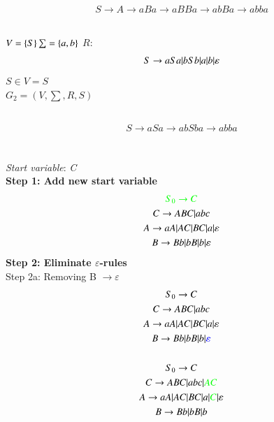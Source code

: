 \documentclass[12pt,letterpaper]{article}
\begin{document}
	\subsection{}
		\begin{gather*}
			S \rightarrow A\rightarrow aBa\rightarrow aBBa\rightarrow abBa\rightarrow abba
		\end{gather*}
	\subsection{}
		$V=\{S\}\\\sum=\{a,b\}\\$
		$R:$
		\begin{gather*}
			S \rightarrow aSa\arrowvert bSb\arrowvert a\arrowvert b\arrowvert \varepsilon
		\end{gather*}
		$S\in V=S$\\
		$G_2=(V,\sum,R,S)$
	\subsection{}
		\begin{gather*}
			S \rightarrow aSa\rightarrow abSba\rightarrow abba
		\end{gather*}
	\section{}
		\textit{Start variable}: \textit{C}\\
		
		\textbf{Step 1: Add new start variable}\\
		\begin{gather*}
			\textcolor{green}{S_0 \rightarrow C}\\
			C \rightarrow ABC\arrowvert abc\\
			A \rightarrow aA\arrowvert AC\arrowvert BC\arrowvert a\arrowvert \varepsilon\\
			B \rightarrow Bb\arrowvert bB\arrowvert b\arrowvert \varepsilon
		\end{gather*}
		\textbf{Step 2: Eliminate $\varepsilon$-rules}\\
		
		Step 2a: Removing B $\rightarrow \varepsilon$
		\begin{gather*}
			S_0 \rightarrow C\\
			C \rightarrow ABC\arrowvert abc\\
			A \rightarrow aA\arrowvert AC\arrowvert BC\arrowvert a\arrowvert \varepsilon\\
			B \rightarrow Bb\arrowvert bB\arrowvert b\arrowvert \textcolor{blue}{\varepsilon}\\
			\\S_0 \rightarrow C\\
			C \rightarrow ABC\arrowvert abc\arrowvert \textcolor{green}{AC}\\
			A \rightarrow aA\arrowvert AC\arrowvert BC\arrowvert a\arrowvert \textcolor{green}{C}\arrowvert \varepsilon\\
			B \rightarrow Bb\arrowvert bB\arrowvert b
		\end{gather*}
	
\end{document}
